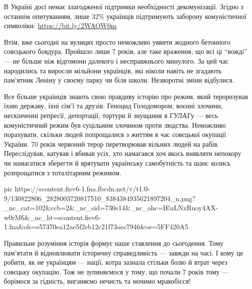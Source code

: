 В Україні досі немає злагодженої підтримки необхідності декомунізації. Згідно з
останнім опитуванням, лише 32\% українців підтримують заборону комуністичної
символіки: \url{https://bit.ly/2WAOW0m}

Втім, вже сьогодні на вулицях просто неможливо уявити жодного бетонного
совєцького бовдура. Пройшло лише 7 років, але таке враження, що всі ці \enquote{вожді}
— не більше ніж відгомони далекого і несправжнього минулого. За цей час
народились та виросли мільйони українців, які ніколи навіть не згадають
пам’ятник Леніну у своєму парку чи біля школи. Незворотні зміни відбулися.

Все більше українців знають свою правдиву історію про режим, який тероризував
їхню державу, їхні сім’ї та друзів. Геноцид Голодомором, воєнні злочини,
нескінченні репресії, депортації, тортури й знущання в ГУЛАГу — весь
комуністичний режим був суцільним злочином проти людства. Неможливо порахувати,
скільки людей попрощалися з життям в час совєцької окупації України. 70 років
червоний терор перетворював вільних людей на рабів. Переслідував, катував і
вбивав усіх, хто намагався хоч якось виявляти непокору чи намагатися зберегти й
врятувати українську самобутність та шанс колись розпрощатися з тоталітарним
режимом.

\ifcmt
pic https://scontent.fiev6-1.fna.fbcdn.net/v/t1.0-9/130822806_2828003720817510_8384384935621897204_n.png?_nc_cat=102&ccb=2&_nc_sid=730e14&_nc_ohc=IEuLNxRuoy4AX-w0rM6&_nc_ht=scontent.fiev6-1.fna&oh=e57370ea12ae5f2eb12c21f73aec7946&oe=5FF420A5
\fi

Правильне розуміння історія формує наше ставлення до сьогодення. Тому пам’ятати
й відновлювати історичну справедливість — завжди на часі. І кому це робити, як
не українцям — нації, котра зазнала  стільки болю й втрат через совєцьку
окупацію. Тож не зупиняємося у тому, що почали 7 років тому — борімося за
гідність, виганяємо нечисть та мочимо мракобісся!
